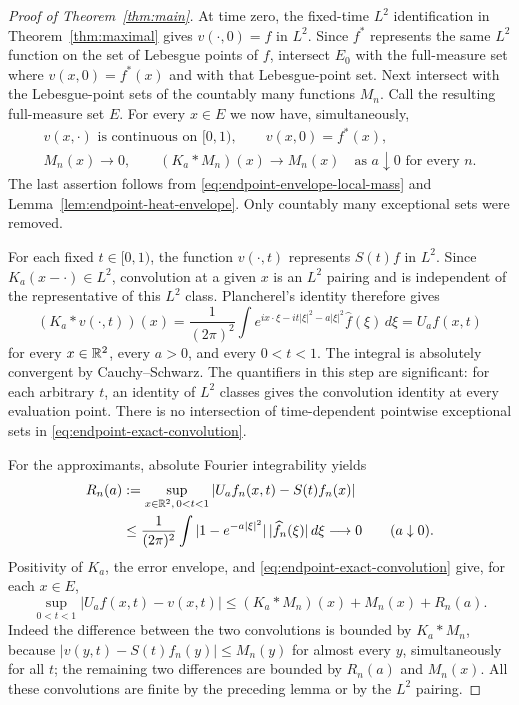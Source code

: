 \begin{proof}[Proof of Theorem~\ref{thm:main}]
At time zero, the fixed-time $L^2$ identification in
Theorem~\ref{thm:maximal} gives $v(\cdot,0)=f$ in $L^2$.  Since $f^*$
represents the same $L^2$ function on the set of Lebesgue points of $f$,
intersect $E_0$ with the full-measure set where $v(x,0)=f^*(x)$ and
with that Lebesgue-point set.
Next intersect with the Lebesgue-point sets of the countably many
functions $M_n$.  Call the resulting full-measure set $E$.  For every
$x\in E$ we now have, simultaneously,
\begin{equation}
 \begin{gathered}
 v(x,\cdot)\text{ is continuous on }[0,1),\qquad v(x,0)=f^*(x),\\
 M_n(x)\longrightarrow0,\qquad
 (K_a*M_n)(x)\longrightarrow M_n(x)
       \quad\text{as }a\downarrow0\text{ for every }n.
 \end{gathered}
 \label{eq:endpoint-common-good-set}
\end{equation}
The last assertion follows from
\eqref{eq:endpoint-envelope-local-mass} and
Lemma~\ref{lem:endpoint-heat-envelope}.  Only countably many exceptional
sets were removed.

For each fixed $t\in[0,1)$, the function $v(\cdot,t)$ represents
$S(t)f$ in $L^2$.  Since $K_a(x-\cdot)\in L^2$, convolution at a given
$x$ is an $L^2$ pairing and is independent of the representative of this
$L^2$ class.  Plancherel's identity therefore gives
\begin{equation}
 (K_a*v(\cdot,t))(x)
  =\frac1{(2\pi)^2}\int e^{ix\cdot\xi-it|\xi|^2-a|\xi|^2}
                                \widehat f(\xi)\,d\xi
  =U_af(x,t)
 \label{eq:endpoint-exact-convolution}
\end{equation}
for every $x\in\mathbb R^2$, every $a>0$, and every $0<t<1$.
The integral is absolutely convergent by Cauchy--Schwarz.  The
quantifiers in this step are significant: for each arbitrary $t$, an
identity of $L^2$ classes gives the convolution identity at every
evaluation point.  There is no intersection of time-dependent pointwise
exceptional sets in \eqref{eq:endpoint-exact-convolution}.

For the approximants, absolute Fourier integrability yields
\begin{align}
 R_n(a)&:=\sup_{x\in\mathbb R^2,\,0<t<1}
               |U_af_n(x,t)-S(t)f_n(x)|\notag\\
 &\le\frac1{(2\pi)^2}\int
               |1-e^{-a|\xi|^2}|\,|\widehat f_n(\xi)|\,d\xi
       \longrightarrow0\qquad(a\downarrow0).
 \label{eq:endpoint-smooth-heat-limit}
\end{align}
Positivity of $K_a$, the error envelope, and
\eqref{eq:endpoint-exact-convolution} give, for each $x\in E$,
\begin{equation}
 \sup_{0<t<1}|U_af(x,t)-v(x,t)|
 \le (K_a*M_n)(x)+M_n(x)+R_n(a).
 \label{eq:endpoint-uniform-gaussian-comparison}
\end{equation}
Indeed the difference between the two convolutions is bounded by
$K_a*M_n$, because
$|v(y,t)-S(t)f_n(y)|\le M_n(y)$ for almost every $y$, simultaneously for
all $t$; the remaining two differences are bounded by $R_n(a)$ and
$M_n(x)$.  All these convolutions are finite by the preceding lemma or
by the $L^2$ pairing.


\end{proof}
